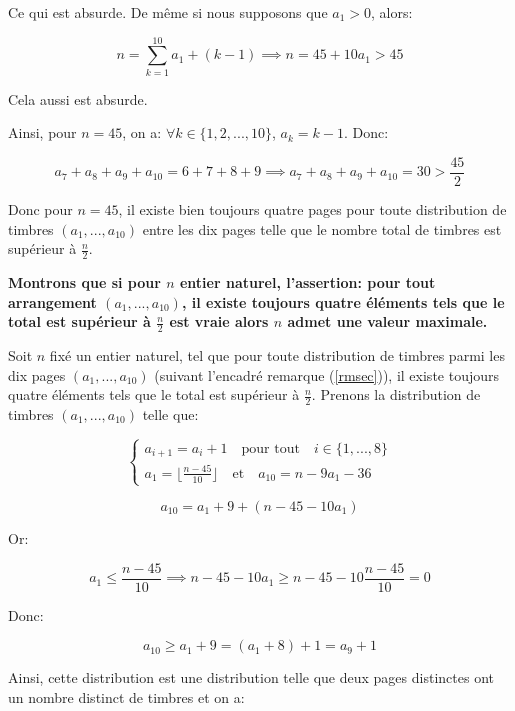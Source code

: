 \documentclass[12pt,a4paper,article]{memoir}
\newcommand{\floor}[1]{\lfloor #1 \rfloor}
\begin{document}
Ce qui est absurde. De même si nous supposons que $a_{1} > 0$, alors:

\[n = \sum_{k=1}^{10} a_{1} + (k-1) \implies n = 45 + 10a_{1} > 45\]

Cela aussi est absurde.

\bigskip

Ainsi, pour $n = 45$, on a: $\forall k \in \{1, 2, ..., 10\}$, $a_{k} = k-1$. Donc: 

\[a_{7} + a_{8} + a_{9} + a_{10} = 6 + 7 + 8 + 9 \implies a_{7} + a_{8} + a_{9} + a_{10} = 30 > \frac{45}{2} \]

Donc pour $n=45$, il existe bien toujours quatre pages pour toute distribution de timbres $(a_{1}, ..., a_{10})$ entre les dix pages telle que le nombre total de timbres est supérieur à $\frac{n}{2}$.

\bigskip

\textbf{Montrons que si pour $n$ entier naturel, l'assertion: pour tout arrangement $(a_{1}, ..., a_{10})$, il existe toujours quatre éléments tels que le total est supérieur à $\frac{n}{2}$ est vraie alors $n$ admet une valeur maximale.}

\bigskip

Soit $n$ fixé un entier naturel, tel que pour toute distribution de timbres parmi les dix pages $(a_{1}, ..., a_{10})$ (suivant l'encadré remarque (\ref{rmsec})), il existe toujours quatre éléments tels que le total est supérieur à $\frac{n}{2}$. Prenons la distribution de timbres $(a_{1}, ..., a_{10})$ telle que:

\begin{equation}
\left\{
	\begin{array}{l}
	a_{i+1} = a_{i} + 1 \quad \textrm{pour tout} \quad i \in \{1, ..., 8\}\\
	a_{1} = \floor{\frac{n - 45}{10}} \quad \textrm{et} \quad a_{10} = n - 9a_{1} - 36
	\end{array}
\right.
\label{equation-def-equidist}
\end{equation}

\[a_{10} = a_{1} + 9 + (n - 45 - 10a_{1})\] 

Or:

\[a_{1} \leq \frac{n - 45}{10} \implies n - 45 - 10a_{1} \geq n - 45 - 10\frac{n - 45}{10} = 0 \]

Donc:

\[a_{10} \geq a_{1} + 9 = (a_{1} + 8) + 1 = a_{9} + 1\]

Ainsi, cette distribution est une distribution telle que deux pages distinctes ont un nombre distinct de timbres et on a:
\end{document}
